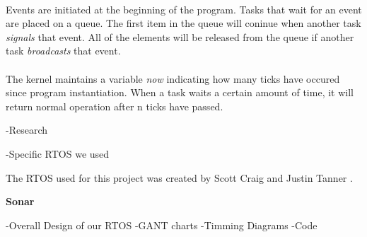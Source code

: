 \\
Events are initiated at the beginning of the program. Tasks that wait for an event are placed on a queue. The first item in the queue will coninue when another task \textit{signals} that event. All of the elements will be released from the queue if another task \textit{broadcasts} that event. \\

\\
The kernel maintains a variable \textit{now} indicating how many ticks have occured since program instantiation. When a task waits a certain amount of time, it will return normal operation after n ticks have passed.


-Research



-Specific RTOS we used

The RTOS used for this project was created by Scott Craig and Justin Tanner \cite{RTOSSJ}.




\noindent\textbf{Sonar}

-Overall Design of our RTOS
-GANT charts
-Timming Diagrams
-Code
